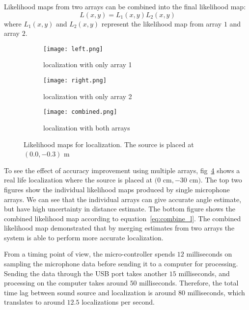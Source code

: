 Likelihood maps from two arrays can be combined into the final likelihood map:
\begin{equation}\label{eq:combine_l}
L(x,y) = L_1(x,y) L_2(x,y)
\end{equation}
where $L_1(x,y)$ and $L_2(x,y)$ represent the likelihood map from array $1$ and array $2$.

\begin{figure}[h!]
  \centering
  \begin{subfigure}[]{.48\textwidth}
    \texttt{[image: left.png]}
    \caption{localization with only array 1}
    \label{fig:liklihood1}
  \end{subfigure}
  \begin{subfigure}[]{.48\textwidth}
    \texttt{[image: right.png]}
    \caption{localization with only array 2}
    \label{fig:liklihood2}
  \end{subfigure}
  \begin{subfigure}[]{.48\textwidth}
    \texttt{[image: combined.png]}
    \caption{localization with both arrays}
    \label{fig:liklihood3}
  \end{subfigure}
  \caption{Likelihood maps for localization. The source is placed at $(0.0,-0.3)$ m}
  \label{fig:liklihood}
\end{figure}

To see the effect of accuracy improvement using multiple arrays, fig~\ref{fig:liklihood} shows a real life localization where the source is placed at $(0$ cm$,-30$ cm$)$. The top two figures show the individual likelihood maps produced by single microphone arrays. We can see that the individual arrays can give accurate angle estimate, but have high uncertainty in distance estimate. The bottom figure shows the combined likelihood map according to equation~\ref{eq:combine_l}. The combined likelihood map demonstrated that by merging estimates from two arrays the system is able to perform more accurate localization. 


From a timing point of view, the micro-controller spends $12$ milliseconds on sampling the microphone data before sending it to a computer for processing. Sending the data through the USB port takes another $15$ milliseconds, and processing on the computer takes around $50$ milliseconds. Therefore, the total time lag between sound source and localization is around $80$ milliseconds, which translates to around $12.5$ localizations per second.
